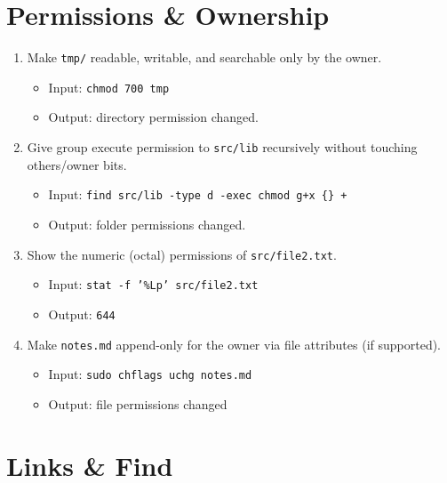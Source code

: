 \section{Permissions \& Ownership}

\begin{enumerate}
\item Make \texttt{tmp/} readable, writable, and searchable only by the owner.
\begin{itemize}
\item Input: \texttt{chmod 700 tmp}
\item Output: directory permission changed.
\end{itemize}

\item Give group execute permission to \texttt{src/lib} recursively without touching others/owner bits.
\begin{itemize}
\item Input: \texttt{find src/lib -type d -exec chmod g+x \{\} +}
\item Output: folder permissions changed.
\end{itemize}

\item Show the numeric (octal) permissions of \texttt{src/file2.txt}.
\begin{itemize}
\item Input: \texttt{stat -f '\%Lp' src/file2.txt}
\item Output: \texttt{644}
\end{itemize}

\item Make \texttt{notes.md} append-only for the owner via file attributes (if supported).
\begin{itemize}
\item Input: \texttt{sudo chflags uchg notes.md}
\item Output: file permissions changed
\end{itemize}
\end{enumerate}

\section{Links \& Find}


